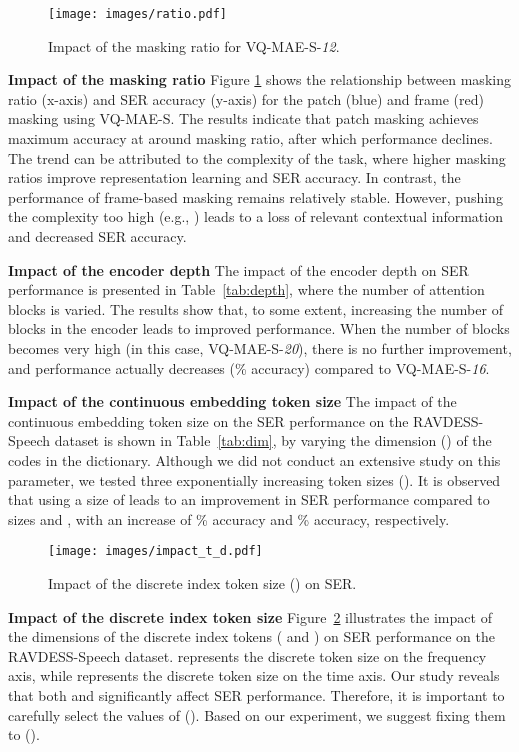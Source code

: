 \documentclass{article}
\newcommand{\myparagraph}[1]{\noindent\textbf{#1}\hspace{.25cm}}
\begin{document}
\begin{figure}[h]
    \centering
    \texttt{[image: images/ratio.pdf]}
    \caption{Impact of the masking ratio for VQ-MAE-S-\emph{12}.}
    \label{fig:ratio}
\end{figure}
\myparagraph{Impact of the masking ratio} Figure \ref{fig:ratio} shows the relationship between masking ratio (x-axis) and SER accuracy (y-axis) for the patch (blue) and frame (red) masking using VQ-MAE-S. The results indicate that patch masking achieves maximum accuracy at around  masking ratio, after which performance declines. The trend can be attributed to the complexity of the task, where higher masking ratios improve representation learning and SER accuracy. In contrast, the performance of frame-based masking remains relatively stable. However, pushing the complexity too high (e.g., ) leads to a loss of relevant contextual information and decreased SER accuracy.


\myparagraph{Impact of the encoder depth}
The impact of the encoder depth on SER performance is presented in Table~\ref{tab:depth}, where the number of attention blocks is varied. The results show that, to some extent, increasing the number of blocks in the encoder leads to improved performance. When the number of blocks becomes very high (in this case, VQ-MAE-S-\emph{20}), there is no further improvement, and performance actually decreases (\% accuracy) compared to VQ-MAE-S-\emph{16}.

\myparagraph{Impact of the continuous embedding token size} The impact of the continuous embedding token size on the SER performance on the RAVDESS-Speech dataset is shown in Table~\ref{tab:dim}, by varying the dimension () of the codes in the dictionary. Although we did not conduct an extensive study on this parameter, we tested three exponentially increasing token sizes (). It is observed that using a size of  leads to an improvement in SER performance compared to sizes  and , with an increase of \% accuracy and \% accuracy, respectively.

\begin{figure}[h]
    \centering
    \texttt{[image: images/impact\_t\_d.pdf]}
    \caption{Impact of the discrete index token size () on SER.}
    \label{fig:patch}
\end{figure}

\myparagraph{Impact of the discrete index token size}
Figure~\ref{fig:patch} illustrates the impact of the dimensions of the discrete index tokens ( and ) on SER performance on the RAVDESS-Speech dataset.  represents the discrete token size on the frequency axis, while  represents the discrete token size on the time axis. Our study reveals that both  and  significantly affect SER performance. Therefore, it is important to carefully select the values of (). Based on our experiment, we suggest fixing them to ().
\end{document}
